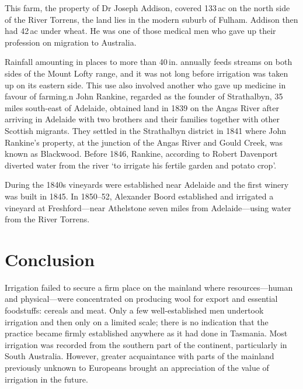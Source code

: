 This farm, the property of Dr Joseph Addison, covered 133\,ac on the
north side of the River Torrens, the land lies in the modern suburb of
Fulham.  Addison then had 42\,ac under wheat. He was one of those
medical men who gave up their profession on migration to
Australia.

Rainfall amounting in places to more than 40\,in. annually feeds
streams on both sides of the Mount Lofty range, and it was not long
before irrigation was taken up on its eastern side.  This use also
involved another who gave up medicine in favour of farming.n John
Rankine, regarded as the founder of Strathalbyn, 35 miles south-east
of Adelaide, obtained land in 1839 on the Angas River after arriving
in Adelaide with two brothers and their families together with other
Scottish migrants.  They settled in the Strathalbyn district in 1841
where John Rankine's property, at the junction of the Angas River and
Gould Creek, was known as Blackwood.  Before 1846, Rankine, according
to Robert Davenport diverted water from the river `to irrigate his
fertile garden and potato crop'.

During the 1840s vineyards were established near Adelaide and the
first winery was built in 1845.  In 1850--52, Alexander Boord established and
irrigated a vineyard at Freshford---near Athelstone seven miles from
Adelaide---using water from the River Torrens.

\section*{Conclusion}

Irrigation failed to secure a firm place on the mainland where
resources---human and physical---were concentrated on producing wool
for export and essential foodstuffs: cereals and meat.  Only a few
well-established men undertook irrigation and then only on a limited
scale; there is no indication that the practice became firmly
established anywhere as it had done in Tasmania.  Most irrigation was
recorded from the southern part of the continent, particularly in
South Australia.  However, greater acquaintance with parts of the
mainland previously unknown to Europeans brought an appreciation of
the value of irrigation in the future.

